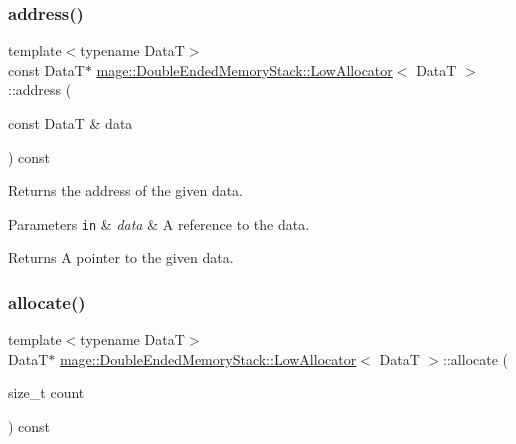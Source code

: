 \subsubsection{\texorpdfstring{address()}{address()}\hspace{0.1cm}{\footnotesize\ttfamily [2/2]}}
{\footnotesize\ttfamily template$<$typename DataT$>$ \\
const DataT$\ast$ \hyperlink{structmage_1_1_double_ended_memory_stack_1_1_low_allocator}{mage\+::\+Double\+Ended\+Memory\+Stack\+::\+Low\+Allocator}$<$ DataT $>$\+::address (\begin{DoxyParamCaption}\item[{const DataT \&}]{data }\end{DoxyParamCaption}) const\hspace{0.3cm}{\ttfamily [noexcept]}}

Returns the address of the given data.


\begin{DoxyParams}[1]{Parameters}
\mbox{\tt in}  & {\em data} & A reference to the data. \\
\hline
\end{DoxyParams}
\begin{DoxyReturn}{Returns}
A pointer to the given data. 
\end{DoxyReturn}
\hypertarget{structmage_1_1_double_ended_memory_stack_1_1_low_allocator_a447a18b6db5720cac0f8ffcf09eb7446}{}\label{structmage_1_1_double_ended_memory_stack_1_1_low_allocator_a447a18b6db5720cac0f8ffcf09eb7446} 
\subsubsection{\texorpdfstring{allocate()}{allocate()}\hspace{0.1cm}{\footnotesize\ttfamily [1/2]}}
{\footnotesize\ttfamily template$<$typename DataT$>$ \\
DataT$\ast$ \hyperlink{structmage_1_1_double_ended_memory_stack_1_1_low_allocator}{mage\+::\+Double\+Ended\+Memory\+Stack\+::\+Low\+Allocator}$<$ DataT $>$\+::allocate (\begin{DoxyParamCaption}\item[{size\+\_\+t}]{count }\end{DoxyParamCaption}) const}

